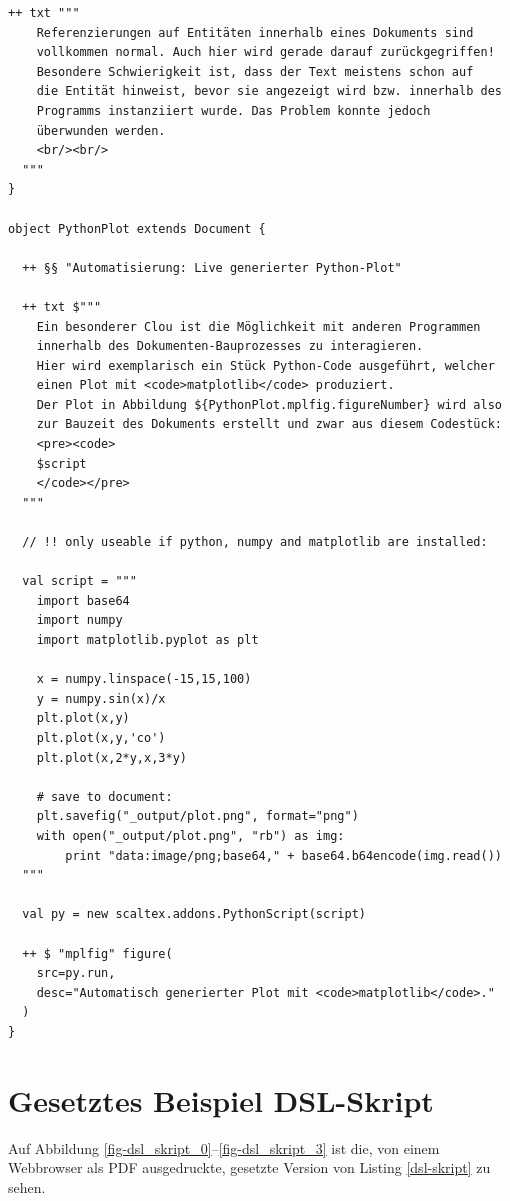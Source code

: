 \begin{lstlisting}[label=dsl-skript,caption=Ausführliches Scala DSL Dokument-Skript.]
  ++ txt """
    Referenzierungen auf Entitäten innerhalb eines Dokuments sind
    vollkommen normal. Auch hier wird gerade darauf zurückgegriffen!
    Besondere Schwierigkeit ist, dass der Text meistens schon auf
    die Entität hinweist, bevor sie angezeigt wird bzw. innerhalb des
    Programms instanziiert wurde. Das Problem konnte jedoch
    überwunden werden.
    <br/><br/>
  """
}

object PythonPlot extends Document {

  ++ §§ "Automatisierung: Live generierter Python-Plot"

  ++ txt $"""
    Ein besonderer Clou ist die Möglichkeit mit anderen Programmen
    innerhalb des Dokumenten-Bauprozesses zu interagieren.
    Hier wird exemplarisch ein Stück Python-Code ausgeführt, welcher
    einen Plot mit <code>matplotlib</code> produziert.
    Der Plot in Abbildung ${PythonPlot.mplfig.figureNumber} wird also
    zur Bauzeit des Dokuments erstellt und zwar aus diesem Codestück:
    <pre><code>
    $script
    </code></pre>
  """

  // !! only useable if python, numpy and matplotlib are installed:

  val script = """
    import base64
    import numpy
    import matplotlib.pyplot as plt

    x = numpy.linspace(-15,15,100)
    y = numpy.sin(x)/x
    plt.plot(x,y)
    plt.plot(x,y,'co')
    plt.plot(x,2*y,x,3*y)

    # save to document:
    plt.savefig("_output/plot.png", format="png")
    with open("_output/plot.png", "rb") as img:
        print "data:image/png;base64," + base64.b64encode(img.read())
  """

  val py = new scaltex.addons.PythonScript(script)

  ++ $ "mplfig" figure(
    src=py.run,
    desc="Automatisch generierter Plot mit <code>matplotlib</code>."
  )
}
\end{lstlisting}

\section{Gesetztes Beispiel DSL-Skript}

Auf Abbildung \ref{fig-dsl_skript_0}--\ref{fig-dsl_skript_3} ist die, von einem Webbrowser als PDF ausgedruckte, gesetzte Version von Listing \ref{dsl-skript} zu sehen.

